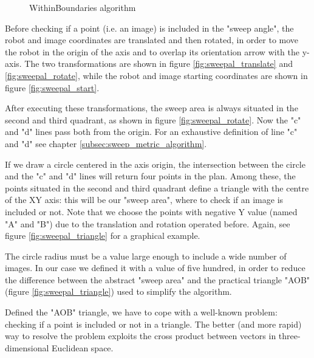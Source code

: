 \begin{figure}[htp]
\begin{center}
    \vspace*{20pt}

  \end{center}
  \caption{WithinBoundaries algorithm}
  \label{fig:withingboundaries}
\end{figure}

%
Before checking if a point (i.e. an image) is included in the "sweep angle", the robot and image coordinates
are translated and then rotated, in order to move the robot in the origin of the axis and to overlap its
orientation arrow with the y-axis. The two transformations are shown in figure \ref{fig:sweepal_translate} and
\ref{fig:sweepal_rotate}, while the robot and image starting coordinates are shown in figure \ref{fig:sweepal_start}.
%

%
After executing these transformations, the sweep area is always situated in the second and third quadrant, as
shown in figure \ref{fig:sweepal_rotate}. Now the "c" and "d" lines pass both from the origin. For an exhaustive
definition of line "c" and "d" see chapter \ref{subsec:sweep_metric_algorithm}.
%

%
If we draw a circle centered in the axis origin, the intersection between the circle and the "c" and "d" lines will
return four points in the plan. Among these, the points situated in the second and third quadrant define a triangle
with the centre of the XY axis: this will be our "sweep area", where to check if an image is included or not. Note
that we choose the points with negative Y value (named "A" and "B") due to the translation and rotation operated
before. Again, see figure \ref{fig:sweepal_triangle} for a graphical example.
%

%
The circle radius must be a value large enough to include a wide number of images. In our case we defined it with a
value of five hundred, in order to reduce the difference between the abstract "sweep area" and the practical triangle
"AOB" (figure \ref{fig:sweepal_triangle}) used to simplify the algorithm.
%

%
Defined the "AOB" triangle, we have to cope with a well-known problem: checking if a point is included or not in a
triangle. The better (and more rapid) way to resolve the problem exploits the cross product between vectors
in three-dimensional Euclidean space.
%

